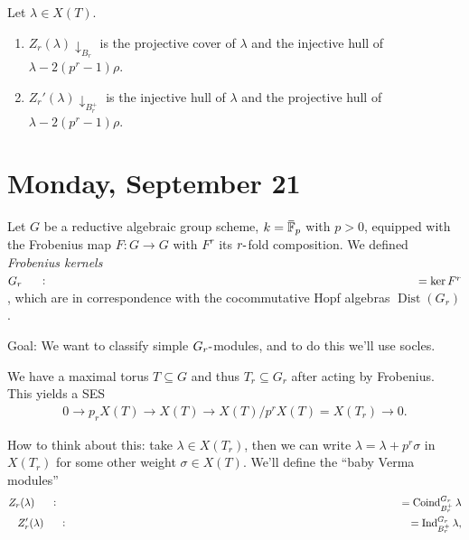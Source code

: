 \begin{proposition}[?]

\begin{proposition}[?]

Let \(\lambda \in X(T)\).

\begin{enumerate}
\def\labelenumi{\arabic{enumi}.}
\tightlist
\item
  \(Z_r(\lambda){\downarrow}_{B_r}\) is the projective cover of
  \(\lambda\) and the injective hull of \(\lambda - 2(p^r-1)\rho\).
\item
  \(Z_r'(\lambda){\downarrow}_{B_r^+}\) is the injective hull of
  \(\lambda\) and the projective hull of \(\lambda - 2(p^r-1)\rho\).
\end{enumerate}

\end{proposition}

\end{proposition}

\hypertarget{monday-september-21}{%
\section{Monday, September 21}\label{monday-september-21}}

Let \(G\) be a reductive algebraic group scheme,
\(k=\mkern 1.5mu\overline{\mkern-1.5mu\mathbb{F}\mkern-1.5mu}\mkern 1.5mu_p\)
with \(p>0\), equipped with the Frobenius map \(F:G\to G\) with \(F^r\)
its \(r{\hbox{-}}\)fold composition. We defined \emph{Frobenius kernels}
\(G_r \mathrel{\vcenter{:}}=\ker F^r\), which are in correspondence with
the cocommutative Hopf algebras \(\operatorname{Dist}(G_r)\).

Goal: We want to classify simple \(G_r{\hbox{-}}\)modules, and to do
this we'll use socles.

We have a maximal torus \(T\subseteq G\) and thus \(T_r \subseteq G_r\)
after acting by Frobenius. This yields a SES
\begin{align*}   0 \to p_r X(T) \to X(T) \to X(T)/p^r X(T) = X(T_r) \to 0 .\end{align*}

How to think about this: take \(\lambda \in X(T_r)\), then we can write
\(\lambda = \lambda + p^r \sigma\) in \(X(T_r)\) for some other weight
\(\sigma \in X(T)\). We'll define the ``baby Verma modules''
\begin{align*}   Z_r(\lambda) \mathrel{\vcenter{:}}=\operatorname{Coind}_{B_r^+}^{G_r} \lambda \\ Z_r'(\lambda) \mathrel{\vcenter{:}}=\operatorname{Ind}_{B_r^+}^{G_r} \lambda ,\end{align*}

